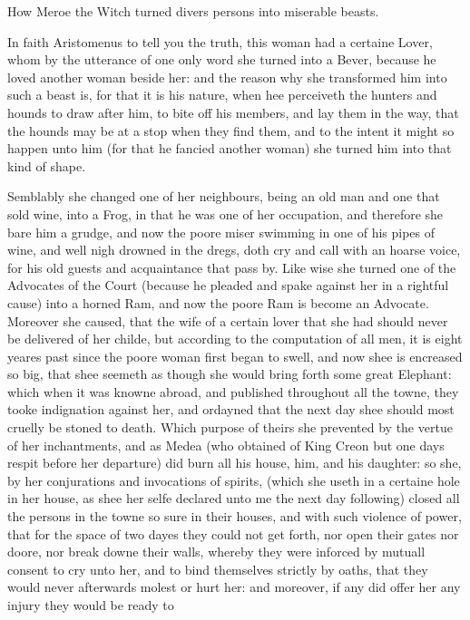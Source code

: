 
How Meroe the Witch turned divers persons into miserable beasts.

In faith Aristomenus to tell you the truth, this woman had a certaine Lover,
whom by the utterance of one only word she turned into a Bever, because he
loved another woman beside her: and the reason why she transformed him into
such a beast is, for that it is his nature, when hee perceiveth the hunters and
hounds to draw after him, to bite off his members, and lay them in the way,
that the hounds may be at a stop when they find them, and to the intent it
might so happen unto him (for that he fancied another woman) she turned him
into that kind of shape.

Semblably she changed one of her neighbours, being an old man and one that sold
wine, into a Frog, in that he was one of her occupation, and therefore she bare
him a grudge, and now the poore miser swimming in one of his pipes of wine, and
well nigh drowned in the dregs, doth cry and call with an hoarse voice, for his
old guests and acquaintance that pass by. Like wise she turned one of the
Advocates of the Court (because he pleaded and spake against her in a rightful
cause) into a horned Ram, and now the poore Ram is become an Advocate. Moreover
she caused, that the wife of a certain lover that she had should never be
delivered of her childe, but according to the computation of all men, it is
eight yeares past since the poore woman first began to swell, and now shee is
encreased so big, that shee seemeth as though she would bring forth some great
Elephant: which when it was knowne abroad, and published throughout all the
towne, they tooke indignation against her, and ordayned that the next day shee
should most cruelly be stoned to death. Which purpose of theirs she prevented
by the vertue of her inchantments, and as Medea (who obtained of King Creon but
one days respit before her departure) did burn all his house, him, and his
daughter: so she, by her conjurations and invocations of spirits, (which she
useth in a certaine hole in her house, as shee her selfe declared unto me the
next day following) closed all the persons in the towne so sure in their
houses, and with such violence of power, that for the space of two dayes they
could not get forth, nor open their gates nor doore, nor break downe their
walls, whereby they were inforced by mutuall consent to cry unto her, and to
bind themselves strictly by oaths, that they would never afterwards molest or
hurt her: and moreover, if any did offer her any injury they would be ready to
